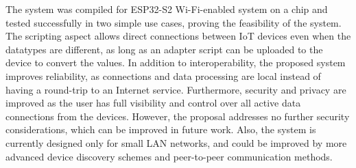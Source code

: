 \documentclass[12pt,a4paper,oneside,pdftex]{report}
\begin{document}
{  The system was compiled for ESP32-S2 Wi-Fi-enabled system on a chip and tested successfully in two simple use cases, proving the feasibility of the system. The scripting aspect allows direct connections between IoT devices even when the datatypes are different, as long as an adapter script can be uploaded to the device to convert the values. In addition to interoperability, the proposed system improves reliability, as connections and data processing are local instead of having a round-trip to an Internet service. Furthermore, security and privacy are improved as the user has full visibility and control over all active data connections from the devices. However, the proposal addresses no further security considerations, which can be improved in future work. Also, the system is currently designed only for small LAN networks, and could be improved by more advanced device discovery schemes and peer-to-peer communication methods. 

}
\end{document}

